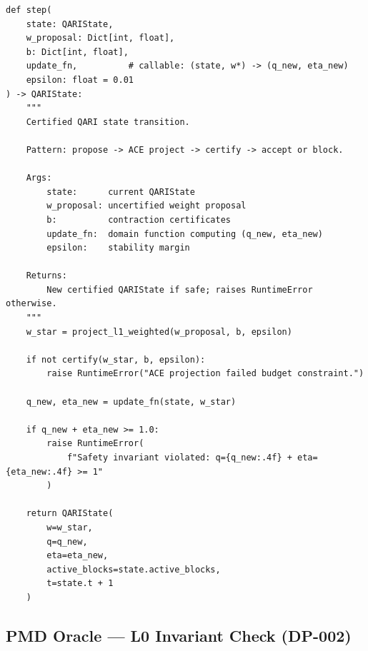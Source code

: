 \documentclass[12pt,letterpaper]{article}
\begin{document}
\begin{lstlisting}[caption={QARI state transition: propose, project, certify},
                   label={lst:step}]
def step(
    state: QARIState,
    w_proposal: Dict[int, float],
    b: Dict[int, float],
    update_fn,          # callable: (state, w*) -> (q_new, eta_new)
    epsilon: float = 0.01
) -> QARIState:
    """
    Certified QARI state transition.

    Pattern: propose -> ACE project -> certify -> accept or block.

    Args:
        state:      current QARIState
        w_proposal: uncertified weight proposal
        b:          contraction certificates
        update_fn:  domain function computing (q_new, eta_new)
        epsilon:    stability margin

    Returns:
        New certified QARIState if safe; raises RuntimeError otherwise.
    """
    w_star = project_l1_weighted(w_proposal, b, epsilon)

    if not certify(w_star, b, epsilon):
        raise RuntimeError("ACE projection failed budget constraint.")

    q_new, eta_new = update_fn(state, w_star)

    if q_new + eta_new >= 1.0:
        raise RuntimeError(
            f"Safety invariant violated: q={q_new:.4f} + eta={eta_new:.4f} >= 1"
        )

    return QARIState(
        w=w_star,
        q=q_new,
        eta=eta_new,
        active_blocks=state.active_blocks,
        t=state.t + 1
    )
\end{lstlisting}

\subsection{PMD Oracle --- L0 Invariant Check (DP-002)}
\end{document}
